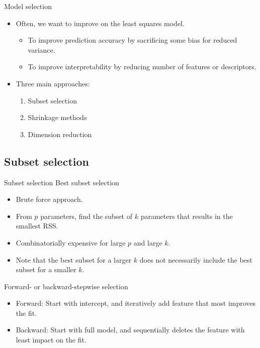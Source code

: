 \documentclass[aspectratio=169]{beamer}
\begin{document}
\begin{frame}{Model selection}
    \begin{itemize}
        \item Often, we want to improve on the least squares model.
        \begin{itemize}
            \item To improve prediction accuracy by sacrificing some bias for reduced variance.
            \item To improve interpretability by reducing number of features or descriptors.
        \end{itemize}
        \item Three main approaches:
        \begin{enumerate}
            \item Subset selection
            \item Shrinkage methods
            \item Dimension reduction
        \end{enumerate}
    \end{itemize}
\end{frame}


\subsection{Subset selection}

\begin{frame}{Subset selection}
    Best subset selection
    \begin{itemize}
        \item Brute force approach.
        \item From $p$ parameters, find the subset of $k$ parameters that results in the smallest RSS.
        \item Combinatorially expensive for large $p$ and large $k$.
        \item Note that the best subset for a larger $k$ does not necessarily include the best subset for a smaller $k$.
    \end{itemize}
    Forward- or backward-stepwise selection
    \begin{itemize}
        \item Forward: Start with intercept, and iteratively add feature that most improves the fit.
        \item Backward: Start with full model, and sequentially deletes the feature with least impact on the fit.
    \end{itemize}
\end{frame} 
\end{document}
